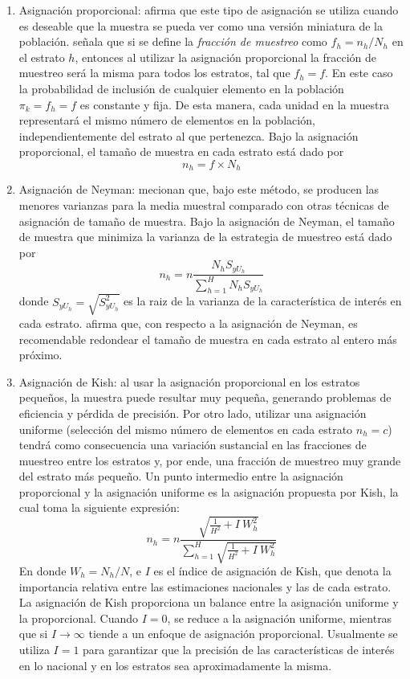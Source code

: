 \documentclass[
  10pt,
  spanish,
]{book}
\begin{document}
\begin{enumerate}
\def\labelenumi{\arabic{enumi}.}
\item
  Asignación proporcional: \citet{Lohr_2019} afirma que este tipo de asignación se utiliza cuando es deseable que la muestra se pueda ver como una versión miniatura de la población. \citet{Gutierrez_2016} señala que si se define la \emph{fracción de muestreo} como \(f_h=n_h/N_h\) en el estrato \(h\), entonces al utilizar la asignación proporcional la fracción de muestreo será la misma para todos los estratos, tal que \(f_h=f\). En este caso la probabilidad de inclusión de cualquier elemento en la población \(\pi_k=f_h=f\) es constante y fija. De esta manera, cada unidad en la muestra representará el mismo número de elementos en la población, independientemente del estrato al que pertenezca. Bajo la asignación proporcional, el tamaño de muestra en cada estrato está dado por
  \[
  n_h=f \times N_h
  \]
\item
  Asignación de Neyman: \citet{Groves_Fowler_Couper_Lepkowski_Singer_Tourangeau_2009} mecionan que, bajo este método, se producen las menores varianzas para la media muestral comparado con otras técnicas de asignación de tamaño de muestra. Bajo la asignación de Neyman, el tamaño de muestra que minimiza la varianza de la estrategia de muestreo está dado por
  \[
  n_h=n\dfrac{N_hS_{yU_h}}{\sum_{h=1}^HN_hS_{yU_h}}
  \]
  donde \(S_{yU_h}=\sqrt{S_{yU_h}^2}\) es la raiz de la varianza de la característica de interés en cada estrato. \citet{Gutierrez_2016} afirma que, con respecto a la asignación de Neyman, es recomendable redondear el tamaño de muestra en cada estrato al entero más próximo.
\item
  Asignación de Kish: al usar la asignación proporcional en los estratos pequeños, la muestra puede resultar muy pequeña, generando problemas de eficiencia y pérdida de precisión. Por otro lado, utilizar una asignación uniforme (selección del mismo número de elementos en cada estrato \(n_h = c\)) tendrá como consecuencia una variación sustancial en las fracciones de muestreo entre los estratos y, por ende, una fracción de muestreo muy grande del estrato más pequeño. Un punto intermedio entre la asignación proporcional y la asignación uniforme es la asignación propuesta por Kish, la cual toma la siguiente expresión:
  \[
  n_h=n\frac{\sqrt{\frac{1}{H^2}+I\ W_h^2}}{\sum_{h=1}^{H}\sqrt{\frac{1}{H^2}+I\ W_h^2}}
  \]
  En donde \(W_h=N_h/N\), e \(I\) es el índice de asignación de Kish, que denota la importancia relativa entre las estimaciones nacionales y las de cada estrato. La asignación de Kish proporciona un balance entre la asignación uniforme y la proporcional. Cuando \(I=0\), se reduce a la asignación uniforme, mientras que si \(I \rightarrow \infty\) tiende a un enfoque de asignación proporcional. Usualmente se utiliza \(I = 1\) para garantizar que la precisión de las características de interés en lo nacional y en los estratos sea aproximadamente la misma.
\end{enumerate}
\end{document}
